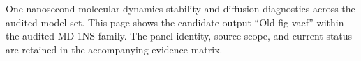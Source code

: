 One-nanosecond molecular-dynamics stability and diffusion diagnostics across the audited model set. This page shows the candidate output ``Old fig vacf'' within the audited MD-1NS family. The panel identity, source scope, and current status are retained in the accompanying evidence matrix.
